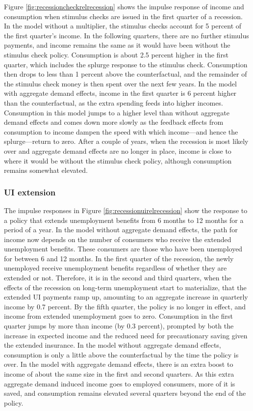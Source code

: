 Figure \ref{fig:recessioncheckrelrecession} shows the impulse response of income and consumption when stimulus checks are issued in the first quarter of a recession.
In the model without a multiplier, the stimulus checks account for 5 percent of the first quarter's income.
In the following quarters, there are no further stimulus payments, and income remains the same as it would have been without the stimulus check policy.
Consumption is about 2.5 percent higher in the first quarter, which includes the splurge response to the stimulus check.
Consumption then drops to less than 1 percent above the counterfactual, and the remainder of the stimulus check money is then spent over the next few years.
In the model with aggregate demand effects, income in the first quarter is 6 percent higher than the counterfactual, as the extra spending feeds into higher incomes.
Consumption in this model jumps to a higher level than without aggregate demand effects and comes down more slowly as the feedback effects from consumption to income dampen the speed with which income---and hence the splurge---return to zero.
After a couple of years, when the recession is most likely over and aggregate demand effects are no longer in place, income is close to where it would be without the stimulus check policy, although consumption remains somewhat elevated.

\subsubsection{UI extension}


The impulse responses in Figure \ref{fig:recessionuirelrecession} show the response to a policy that extends unemployment benefits from 6 months to 12 months for a period of a year.
In the model without aggregate demand effects, the path for income now depends on the number of consumers who receive the extended unemployment benefits.
These consumers are those who have been unemployed for between 6 and 12 months.
In the first quarter of the recession, the newly unemployed receive unemployment benefits regardless of whether they are extended or not.
Therefore, it is in the second and third quarters, when the effects of the recession on long-term unemployment start to materialize, that the extended UI payments ramp up, amounting to an aggregate increase in quarterly income by 0.7 percent.
By the fifth quarter, the policy is no longer in effect, and income from extended unemployment goes to zero.
Consumption in the first quarter jumps by more than income (by 0.3 percent), prompted by both the increase in expected income and the reduced need for precautionary saving given the extended insurance.
In the model without aggregate demand effects, consumption is only a little above the counterfactual by the time the policy is over.
In the model with aggregate demand effects, there is an extra boost to income of about the same size in the first and second quarters.
As this extra aggregate demand induced income goes to employed consumers, more of it is saved, and consumption remains elevated several quarters beyond the end of the policy.

